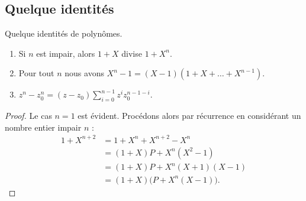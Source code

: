 \subsection{Quelque identités}

\begin{lemma}   \label{LemISPooHIKJBU}
    Quelque identités de polynômes.
    \begin{enumerate}
        \item   \label{ItemLTBooAcyMtN}
            Si \( n\) est impair, alors \( 1+X\) divise \( 1+X^n\).
        \item\label{ItemLTBooAcyMtNii}
            Pour tout \( n\) nous avons \( X^n-1=(X-1)(1+X+\ldots +X^{n-1})\).
        \item
            \( z^n-z_0^n=(z-z_0)\sum_{i=0}^{n-1}z^iz_{0}^{n-1-i}\).
    \end{enumerate}
\end{lemma}

\begin{proof}
    Le cas \( n=1\) est évident. Procédons alors par récurrence en considérant un nombre entier impair \( n\) :
    \begin{subequations}
        \begin{align}
            1+X^{n+2}&=1+X^n+X^{n+2}-X^n\\
                    &=(1+X)P+X^n(X^2-1)\\
                    &=(1+X)P+X^n(X+1)(X-1)\\
                    &=(1+X)\big( P+X^n(X-1) \big).
        \end{align}
    \end{subequations}
\end{proof}
